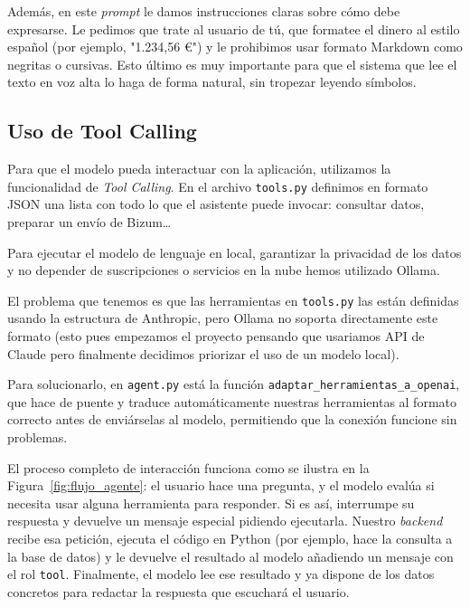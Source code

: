 Además, en este \textit{prompt} le damos instrucciones claras sobre cómo debe 
expresarse. Le pedimos que trate al usuario de tú, que formatee el dinero al 
estilo español (por ejemplo, "1.234,56 €") y le prohibimos usar formato 
Markdown como negritas o cursivas. Esto último es muy importante para que el 
sistema que lee el texto en voz alta lo haga de forma natural, sin tropezar 
leyendo símbolos.   

\subsection{Uso de Tool Calling }

Para que el modelo pueda interactuar con la aplicación, utilizamos la 
funcionalidad de \textit{Tool Calling}. En el archivo \texttt{tools.py} 
definimos en formato JSON una lista con todo lo que el asistente puede invocar: 
consultar datos, preparar un envío de Bizum\dots

Para ejecutar el modelo de lenguaje en local, garantizar la privacidad de los datos
y no depender de suscripciones o servicios en la nube hemos utilizado Ollama. 

El problema que tenemos es que las herramientas en \texttt{tools.py} las están 
definidas usando la estructura de Anthropic, pero Ollama no soporta directamente 
este formato (esto pues empezamos el proyecto pensando que usariamos API de Claude 
pero finalmente decidimos priorizar el uso de un modelo local). 

Para solucionarlo, en \texttt{agent.py} está la función 
\texttt{adaptar\_herramientas\_a\_openai}, que hace de puente y traduce 
automáticamente nuestras herramientas al formato correcto antes de enviárselas al 
modelo, permitiendo que la conexión funcione sin problemas.

El proceso completo de interacción funciona como se ilustra en la
Figura~\ref{fig:flujo_agente}:
el usuario hace una pregunta, y el modelo evalúa si necesita usar alguna herramienta para responder. Si es así, interrumpe su respuesta y devuelve un mensaje especial pidiendo ejecutarla. Nuestro \emph{backend} recibe esa petición, ejecuta el código en Python (por ejemplo, hace la consulta a la base de datos) y le devuelve el resultado al modelo añadiendo un mensaje con el rol \texttt{tool}. Finalmente, el modelo lee ese resultado y ya dispone de los datos concretos para redactar la respuesta que escuchará el usuario.



